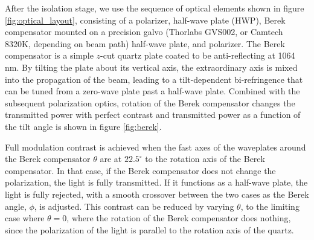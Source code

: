 \documentclass[twocolumn,aps,pra,showpacs,preprintnumbers,bibnotes]{revtex4-1}
\begin{document}
After the isolation stage, we use the sequence of optical elements shown in figure \ref{fig:optical_layout}, consisting of a polarizer, half-wave plate (HWP), Berek compensator mounted on a precision galvo (Thorlabs GVS002, or Camtech 8320K, depending on beam path) half-wave plate, and polarizer. 
The Berek compensator is a simple $z$-cut quartz plate coated to be anti-reflecting at 1064 nm. 
By tilting the plate about its vertical axis, the extraordinary axis is mixed into the propagation of the beam, leading to a tilt-dependent bi-refringence that can be tuned from a zero-wave plate past a half-wave plate.
Combined with the subsequent polarization optics, rotation of the Berek compensator changes the transmitted power with perfect contrast and transmitted power as a function of the tilt angle is shown in figure \ref{fig:berek}.

Full modulation contrast is achieved when the fast axes of the waveplates around the Berek compensator $\theta$ are at $22.5^\circ$ to the rotation axis of the Berek compensator.
In that case, if the Berek compensator does not change the polarization, the light is fully transmitted. 
If it functions as a half-wave plate, the light is fully rejected, with a smooth crossover between the two cases as the Berek angle, $\phi$, is adjusted.
This contrast can be reduced by varying $\theta$, to the limiting case where $\theta=0$, where the rotation of the Berek compensator does nothing, since the polarization of the light is parallel to the rotation axis of the quartz.
\end{document}
